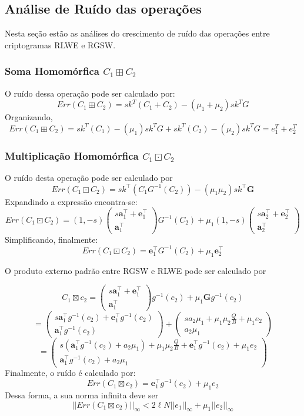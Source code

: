 \subsection{Análise de Ruído das operações}

Nesta seção estão as análises do crescimento de ruído das operações entre criptogramas RLWE e RGSW.
\subsubsection*{Soma Homomórfica $C_1 \boxplus  C_2$}
O ruído dessa operação pode ser calculado por:
$$
Err(C_1 \boxplus  C_2) = sk^T(C_1 + C_2) - (\mu_1 + \mu_2)sk^TG
$$
Organizando,
$$
Err(C_1 \boxplus  C_2) = sk^T(C_1) - (\mu_1)sk^TG + sk^T(C_2) - (\mu_2)sk^TG = e_1^T + e_2^T 
$$

\subsubsection{Multiplicação Homomórfica $C_1 \boxdot C_2$}
O ruído desta operação pode ser calculado por
$$
Err(C_1 \boxdot C_2) = sk^\top(C_1G ^{-1}(C_2)) - (\mu_1\mu_2)sk^\top \mathbf{G}
$$
Expandindo a expressão encontra-se:
$$
Err(C_1 \boxdot C_2) = (1,-s) \begin{pmatrix} s \mathbf{a}_1^\top + \mathbf{e}_1^\top \\ \mathbf{a}_ 1^\top \end{pmatrix}G ^{-1}(C_2) + \mu_1(1,-s)\begin{pmatrix} s \mathbf{a}_2^\top + \mathbf{e}_2^\top \\ \mathbf{a}_ 2^\top \end{pmatrix}
$$
Simplificando, finalmente:
$$
Err(C_1 \boxdot C_2) = \mathbf{e}_1^\top G ^{-1}(C_2) + \mu_1 \mathbf{e}_2^\top
$$

O produto externo padrão entre RGSW e RLWE pode ser calculado por

$$C_1 \boxtimes c_2 = \begin{pmatrix} s \mathbf{a}_1^\top + \mathbf{e}_1^\top \\ \mathbf{a}_ 1^\top \end{pmatrix}g^{-1}(c_2) + \mu_1\mathbf{G}g^{-1}(c_2)$$ 
$$=\begin{pmatrix} s \mathbf{a}_1^\top g^{-1}(c_2) + \mathbf{e}_1^\top g^{-1}(c_2) \\ \mathbf{a}_ 1^\top g^{-1}(c_2) \end{pmatrix} + \begin{pmatrix} s a_2 \mu_1 + \mu_1 \mu_2 \frac{Q}{B} + \mu_1 e_2 \\ a_2 \mu_1 \end{pmatrix} $$
$$=\begin{pmatrix} s ( \mathbf{a}_1^\top g^{-1}(c_2) + a_2\mu_1) + \mu_1\mu_2\frac{Q}{B} +  \mathbf{e}_1^\top g^{-1}(c_2) +\mu_1 e_2 \\ \mathbf{a}_ 1^\top g^{-1}(c_2) + a_2 \mu_1 \end{pmatrix}$$
Finalmente, o ruído é calculado por:
$$
Err(C_1 \boxtimes c_2) = \mathbf{e}_1^\top g^{-1}(c_2) +\mu_1 e_2  
$$
Dessa forma, a sua norma infinita deve ser
$$
||Err(C_1 \boxtimes c_2)||_\infty < 2\ell N||e_1||_\infty + \mu_1 ||e_2||_\infty 
$$


